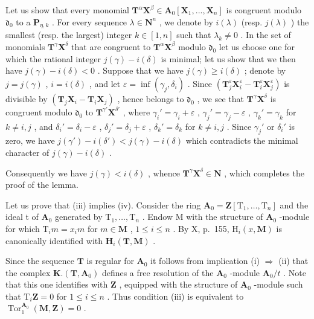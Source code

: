 Let us show that every monomial \(\mathbf{T}^{\alpha}\mathbf{X}^{\beta}\in\mathbf{A}_{0}[\mathbf{X}_{1},..., \mathbf{X}_{n}]\) is congruent modulo \(\mathfrak{d}_{0}\) to a \(\mathbf{P}_{\eta,k}\) . For every sequence \(\lambda\in\mathbf{N}^{n}\) , we denote by \(i(\lambda)\) (resp. \(j(\lambda)\) ) the smallest (resp. the largest) integer \(k\in[1,n]\) such that \(\lambda_{k}\neq0\) . In the set of monomials \(\mathbf{T}^{\gamma}\mathbf{X}^{\delta}\) that are congruent to \(\mathbf{T}^{\alpha}\mathbf{X}^{\beta}\) modulo \(\mathfrak{d}_{0}\) let us choose one for which the rational integer \(j(\gamma)-i(\delta)\) is minimal; let us show that we then have \(j(\gamma)-i(\delta)<0\) . Suppose that we have \(j(\gamma)\geqslant i(\delta)\) ; denote by \(j=j(\gamma)\) , \(i=i(\delta)\) , and let \(\varepsilon=\inf(\gamma_{j},\delta_{i})\) . Since \((\mathbf{T}_{j}^{\varepsilon}\mathbf{X}_{i}^{\varepsilon}-\mathbf{T}_{i}^{\varepsilon}\mathbf{X}_{j}^{\varepsilon})\) is divisible by \((\mathbf{T}_{j}\mathbf{X}_{i}-\mathbf{T}_{i}\mathbf{X}_{j})\) , hence belongs to \(\mathfrak{d}_{0}\) , we see that \(\mathbf{T}^{\gamma}\mathbf{X}^{\delta}\) is congruent modulo \(\mathfrak{d}_{0}\) to \(\mathbf{T}^{\gamma'}\mathbf{X}^{\delta'}\) , where \(\gamma_{i}'=\gamma_{i}+\varepsilon\) , \(\gamma_{j}'=\gamma_{j}-\varepsilon\) , \(\gamma_{k}'=\gamma_{k}\) for \(k\neq i,j\) , and \(\delta_{i}'=\delta_{i}-\varepsilon\) , \(\delta_{j}'=\delta_{j}+\varepsilon\) , \(\delta_{k}'=\delta_{k}\) for \(k\neq i,j\) . Since \(\gamma_{j}'\) or \(\delta_{i}'\) is zero, we have \(j(\gamma')-i(\delta')<j(\gamma)-i(\delta)\) which contradicts the minimal character of \(j(\gamma)-i(\delta)\) .

Consequently we have \(j(\gamma) < i(\delta)\) , whence \(\mathbf{T}^{\gamma}\mathbf{X}^{\delta} \in \mathbf{N}\) , which completes the proof of the lemma.

Let us prove that (iii) implies (iv). Consider the ring \(\mathbf{A}_0 = \mathbf{Z}[\mathrm{T}_1, \ldots, \mathrm{T}_n]\) and the ideal t of \(\mathbf{A}_0\) generated by \(\mathrm{T}_1, \ldots, \mathrm{T}_n\) . Endow M with the structure of \(\mathbf{A}_0\) -module for which \(\mathrm{T}_i m = x_i m\) for \(m \in \mathbf{M}\) , \(1 \leqslant i \leqslant n\) . By X, p.~155, \(\mathrm{H}_i(x, \mathbf{M})\) is canonically identified with \(\mathbf{H}_i(\mathbf{T}, \mathbf{M})\) .

Since the sequence \(\mathbf{T}\) is regular for \(\mathbf{A}_{0}\) it follows from implication (i) \(\Rightarrow\) (ii) that the complex \(\mathbf{K}.\left(\mathbf{T},\mathbf{A}_{0}\right)\) defines a free resolution of the \(\mathbf{A}_{0}\) -module \(\mathbf{A}_{0}/t\) . Note that this one identifies with \(\mathbf{Z}\) , equipped with the structure of \(\mathbf{A}_{0}\) -module such that \(\mathrm{T}_{i}\mathbf{Z}=0\) for \(1\leqslant i\leqslant n\) . Thus condition (iii) is equivalent to \(\operatorname{Tor}_{1}^{\mathbf{A}_{0}}(\mathbf{M},\mathbf{Z})=0\) .

